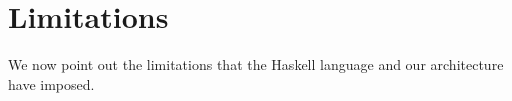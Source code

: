 \section{Limitations}

We now point out the limitations that the Haskell language and our architecture 
have imposed.




